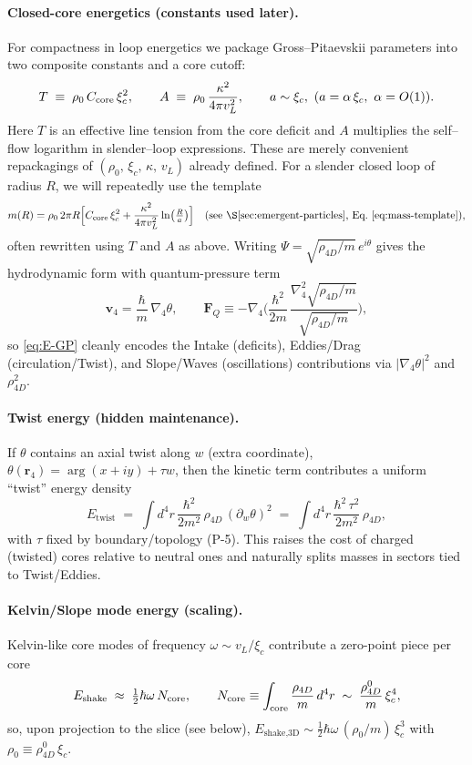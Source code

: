 \paragraph*{Closed-core energetics (constants used later).}
For compactness in loop energetics we package Gross–Pitaevskii parameters into two composite constants and a core cutoff:
\[
T\;\equiv\;\rho_0\,C_{\rm core}\,\xi_c^2,\qquad
A\;\equiv\;\rho_0\,\frac{\kappa^2}{4\pi v_L^2},\qquad
a\sim\xi_c,\ (a=\alpha\,\xi_c,\ \alpha=O(1)).
\]
Here $T$ is an effective line tension from the core deficit and $A$ multiplies the self–flow logarithm in slender–loop expressions. These are merely convenient repackagings of $(\rho_0,\,\xi_c,\,\kappa,\,v_L)$ already defined.
For a slender closed loop of radius $R$, we will repeatedly use the template
\[
 m(R)=\rho_0\,2\pi R\Big[C_{\rm core}\,\xi_c^2+\frac{\kappa^2}{4\pi v_L^2}\ln\!\big(\tfrac{R}{a}\big)\Big]
 \quad\text{(see \S\ref{sec:emergent-particles}, Eq.~\eqref{eq:mass-template})},
\]
often rewritten using $T$ and $A$ as above.
Writing $\Psi=\sqrt{\rho_{4D}/m}\,e^{i\theta}$ gives the hydrodynamic form with quantum-pressure term
\[
\mathbf v_4=\frac{\hbar}{m}\,\nabla_4\theta,\qquad
\mathbf F_Q \equiv -\nabla_4\!\Big(\frac{\hbar^2}{2m}\,\frac{\nabla_4^2\sqrt{\rho_{4D}/m}}{\sqrt{\rho_{4D}/m}}\Big),
\]
so \eqref{eq:E-GP} cleanly encodes the Intake (deficits), Eddies/Drag (circulation/Twist), and Slope/Waves (oscillations) contributions via $|\nabla_4\theta|^2$ and $\rho_{4D}^2$.

\paragraph{Twist energy (hidden maintenance).}
If $\theta$ contains an axial twist along $w$ (extra coordinate), $\theta(\mathbf r_4)=\arg(x+iy)+\tau w$, then the kinetic term contributes a uniform ``twist'' energy density
\begin{equation}
E_{\text{twist}} \;=\; \int d^4 r\, \frac{\hbar^2}{2m^2}\,\rho_{4D}\,(\partial_w\theta)^2
\;=\; \int d^4 r\, \frac{\hbar^2\,\tau^2}{2m^2}\,\rho_{4D} ,
\end{equation}
with $\tau$ fixed by boundary/topology (P-5). This raises the cost of charged (twisted) cores relative to neutral ones and naturally splits masses in sectors tied to Twist/Eddies.

\paragraph{Kelvin/Slope mode energy (scaling).}
Kelvin-like core modes of frequency $\omega\sim v_L/\xi_c$ contribute a zero-point piece per core
\begin{equation}
E_{\text{shake}} \;\approx\; \tfrac{1}{2}\hbar\omega\,N_{\rm core},
\qquad
N_{\rm core} \equiv \int_{\text{core}} \frac{\rho_{4D}}{m}\,d^4 r
\;\sim\; \frac{\rho_{4D}^0}{m}\,\xi_c^4,
\end{equation}
so, upon projection to the slice (see below), $E_{\text{shake,3D}}\sim \tfrac{1}{2}\hbar\omega\,(\rho_0/m)\,\xi_c^3$ with $\rho_0\equiv \rho_{4D}^0\,\xi_c$.

